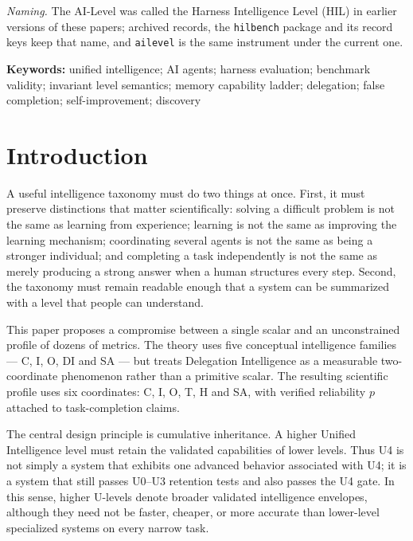 \documentclass[11pt]{article}
\theoremstyle{definition}
\begin{document}
\begin{abstract}
pairs (two-sided sign test $p=0.00635$); the binary comparison was not significant (McNemar $p=0.125$). This discriminates the archived configurations on these instances, not model tiers in general. Auditing also found four answer-key defects and two apparatus defects. We therefore require specification--key tests, cross-tier concordance audits, graded failure modes, per-coordinate headroom, longitudinal evidence, and explicit resource envelopes. The level thresholds remain working definitions requiring broader calibration.
\end{abstract}

\noindent\emph{Naming.} The AI-Level was called the Harness Intelligence Level (HIL) in earlier versions of these papers; archived records, the \texttt{hilbench} package and its record keys keep that name, and \texttt{ailevel} is the same instrument under the current one.

\noindent\textbf{Keywords:} unified intelligence; AI agents; harness evaluation; benchmark validity; invariant level semantics; memory capability ladder; delegation; false completion; self-improvement; discovery

\tableofcontents
\bigskip

\section{Introduction}

A useful intelligence taxonomy must do two things at once. First, it must preserve distinctions that matter scientifically: solving a difficult problem is not the same as learning from experience; learning is not the same as improving the learning mechanism; coordinating several agents is not the same as being a stronger individual; and completing a task independently is not the same as merely producing a strong answer when a human structures every step. Second, the taxonomy must remain readable enough that a system can be summarized with a level that people can understand.

This paper proposes a compromise between a single scalar and an unconstrained profile of dozens of metrics. The theory uses five conceptual intelligence families --- C, I, O, DI and SA --- but treats Delegation Intelligence as a measurable two-coordinate phenomenon rather than a primitive scalar. The resulting scientific profile uses six coordinates: C, I, O, T, H and SA, with verified reliability $p$ attached to task-completion claims.

The central design principle is cumulative inheritance. A higher Unified Intelligence level must retain the validated capabilities of lower levels. Thus U4 is not simply a system that exhibits one advanced behavior associated with U4; it is a system that still passes U0--U3 retention tests and also passes the U4 gate. In this sense, higher U-levels denote broader validated intelligence envelopes, although they need not be faster, cheaper, or more accurate than lower-level specialized systems on every narrow task.
\end{document}

